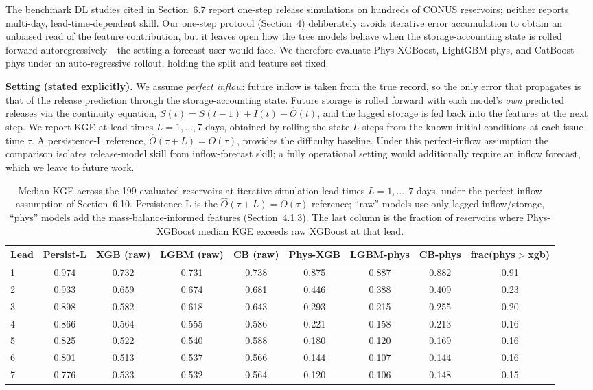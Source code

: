 \documentclass[journal]{ascelike-new}
\begin{document}
The benchmark DL studies cited in Section~6.7 \citep{Tran2025, Zhang2025} report one-step release simulations on hundreds of CONUS reservoirs; neither reports multi-day, lead-time-dependent skill. Our one-step protocol (Section~4) deliberately avoids iterative error accumulation to obtain an unbiased read of the feature contribution, but it leaves open how the tree models behave when the storage-accounting state is rolled forward autoregressively---the setting a forecast user would face. We therefore evaluate Phys-XGBoost, LightGBM-phys, and CatBoost-phys under an auto-regressive rollout, holding the split and feature set fixed.

\textbf{Setting (stated explicitly).} We assume \emph{perfect inflow}: future inflow is taken from the true record, so the only error that propagates is that of the release prediction through the storage-accounting state. Future storage is rolled forward with each model's \emph{own} predicted releases via the continuity equation, $S(t) = S(t-1) + I(t) - \hat O(t)$, and the lagged storage is fed back into the features at the next step. We report KGE at lead times $L = 1,\dots,7$ days, obtained by rolling the state $L$ steps from the known initial conditions at each issue time $\tau$. A persistence-L reference, $\hat O(\tau+L) = O(\tau)$, provides the difficulty baseline. Under this perfect-inflow assumption the comparison isolates release-model skill from inflow-forecast skill; a fully operational setting would additionally require an inflow forecast, which we leave to future work.

\begin{table}[t]
\centering
\caption{Median KGE across the 199 evaluated reservoirs at iterative-simulation lead times $L=1,\dots,7$ days, under the perfect-inflow assumption of Section~6.10. Persistence-L is the $\hat O(\tau+L)=O(\tau)$ reference; ``raw'' models use only lagged inflow/storage, ``phys'' models add the mass-balance-informed features (Section~4.1.3). The last column is the fraction of reservoirs where Phys-XGBoost median KGE exceeds raw XGBoost at that lead.}
\label{tab:rollout}
\small
\begin{tabular}{lcccccccc}
\toprule
Lead & Persist-L & XGB (raw) & LGBM (raw) & CB (raw) & Phys-XGB & LGBM-phys & CB-phys & frac(phys$>$xgb) \\
\midrule
1 & 0.974 & 0.732 & 0.731 & 0.738 & 0.875 & 0.887 & 0.882 & 0.91 \\
2 & 0.933 & 0.659 & 0.674 & 0.681 & 0.446 & 0.388 & 0.409 & 0.23 \\
3 & 0.898 & 0.582 & 0.618 & 0.643 & 0.293 & 0.215 & 0.255 & 0.20 \\
4 & 0.866 & 0.564 & 0.555 & 0.586 & 0.221 & 0.158 & 0.213 & 0.16 \\
5 & 0.825 & 0.522 & 0.540 & 0.588 & 0.180 & 0.120 & 0.169 & 0.16 \\
6 & 0.801 & 0.513 & 0.537 & 0.566 & 0.144 & 0.107 & 0.144 & 0.16 \\
7 & 0.776 & 0.533 & 0.532 & 0.564 & 0.120 & 0.106 & 0.148 & 0.15 \\
\bottomrule
\end{tabular}
\end{table}
\end{document}
